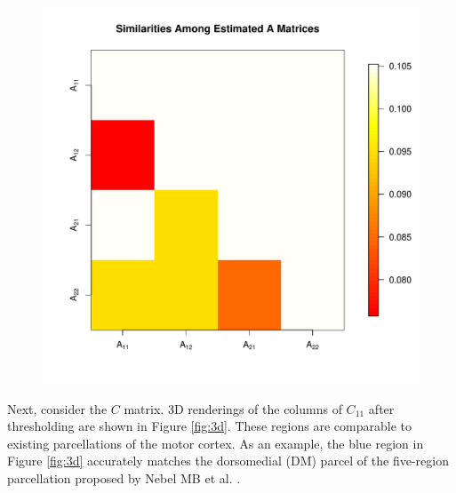 \documentclass[times,twocolumn,final,authoryear]{elsarticle}
\let\oldref\ref
\renewcommand{\ref}[1]{(\oldref{#1})}
\begin{document}
\begin{figure}
\centering
\includegraphics[scale=.4]{A-matrices-similarity.pdf}
\label{fig:matsim}
\end{figure}

Next, consider the $C$ matrix. 3D renderings of the columns of $C_{11}$ after thresholding are shown in Figure \oldref{fig:3d}. These regions are comparable to existing parcellations of the motor cortex. As an example, the blue region in Figure \oldref{fig:3d} accurately matches the dorsomedial (DM) parcel of the five-region parcellation proposed by Nebel MB et al. \citep{nebel2014disruption}.
\end{document}
